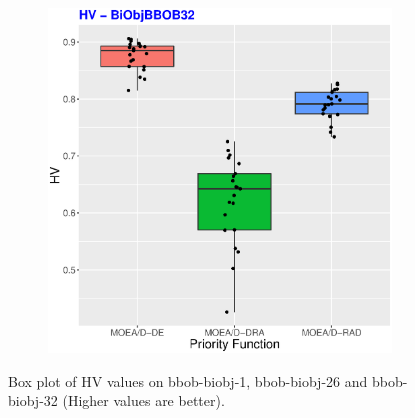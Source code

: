 \begin{figure}[!t]
\begin{subfigure}[b]{0.33\textwidth}
	\end{subfigure}
	\begin{subfigure}[b]{0.33\textwidth}
		\centering
		\includegraphics[width=1\textwidth, height=1\textwidth]{img/BiObjBBOB32_HV.eps}
	\end{subfigure}
	\caption{Box plot of HV values on  bbob-biobj-1,  bbob-biobj-26 and  bbob-biobj-32 (Higher values are better).}
	\label{HVS}
\end{figure}


